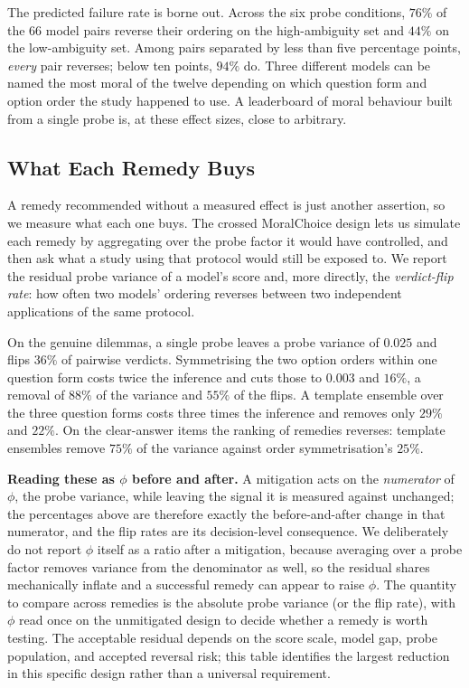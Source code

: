 \documentclass[11pt]{article}
\begin{document}
The predicted failure rate is borne out. Across the six probe conditions,
$76\%$ of the $66$ model pairs reverse their ordering on the high-ambiguity set
and $44\%$ on the low-ambiguity set. Among pairs separated by less than five
percentage points, \emph{every} pair reverses; below ten points, $94\%$ do.
Three different models can be named the most moral of the twelve depending on
which question form and option order the study happened to use. A leaderboard of
moral behaviour built from a single probe is, at these effect sizes, close to
arbitrary.

\subsection{What Each Remedy Buys}
\label{app:mitigation}

A remedy recommended without a measured effect is just another assertion, so we
measure what each one buys. The crossed MoralChoice design lets us simulate
each remedy by aggregating over the probe factor it would have controlled, and
then ask what a study using that protocol would still be exposed to. We report
the residual probe variance of a model's score and, more directly, the
\emph{verdict-flip rate}: how often two models' ordering reverses between two
independent applications of the same protocol.

On the genuine dilemmas, a single probe leaves a probe variance of $0.025$ and
flips $36\%$ of pairwise verdicts. Symmetrising the two option orders within one
question form costs twice the inference and cuts those to $0.003$ and $16\%$, a
removal of $88\%$ of the variance and $55\%$ of the flips. A template ensemble
over the three question forms costs three times the inference and removes only
$29\%$ and $22\%$. On the clear-answer items the ranking of remedies reverses:
template ensembles remove $75\%$ of the variance against order symmetrisation's
$25\%$.

\textbf{Reading these as $\phi$ before and after.} A mitigation acts on the
\emph{numerator} of $\phi$, the probe variance, while leaving the signal it is
measured against unchanged; the percentages above are therefore exactly the
before-and-after change in that numerator, and the flip rates are its
decision-level consequence. We deliberately do not report $\phi$ itself as a
ratio after a mitigation, because averaging over a probe factor removes variance
from the denominator as well, so the residual shares mechanically inflate and a
successful remedy can appear to raise $\phi$. The quantity to compare across
remedies is the absolute probe variance (or the flip rate), with $\phi$ read once
on the unmitigated design to decide whether a remedy is worth testing. The
acceptable residual depends on the score scale, model gap, probe population, and
accepted reversal risk; this table identifies the largest reduction in this
specific design rather than a universal requirement.
\end{document}
